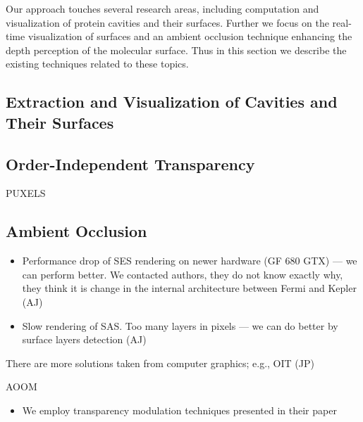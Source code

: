 Our approach touches several research areas, including computation and visualization of protein cavities and their surfaces. 
Further we focus on the real-time visualization of surfaces and an ambient occlusion technique enhancing the depth perception of the molecular surface. 
Thus in this section we describe the existing techniques related to these topics.

\subsection{Extraction and Visualization of Cavities and Their Surfaces}
\cite{totrov1996contour}
\cite{krone2009interactive}
\cite{lindow2010accelerated}
\cite{parulek2012implicit}
\cite{connolly1983analytical}


\subsection{Order-Independent Transparency}
\cite{carpenter1984abuffer}
\cite{everitt2001interactive}
\cite{bavoil2008order}
\cite{yang2010real}
\cite{enderton2011stochastic}
\cite{salvi2011adaptive}
\cite{maule2012memory}%
PUXELS \cite{kauker2013rendering}


\subsection{Ambient Occlusion}
\cite{tarini2006ambient}
\cite{grottel2012object}
\cite{staib2015ambient} 
\cite{borland2011ambient}




\begin{itemize}
  \item Performance drop of SES rendering on newer hardware (GF 680 GTX) --- we can perform better. We contacted authors, they do not know exactly why, they think it is change in the internal architecture between Fermi and Kepler (AJ)
  \item Slow rendering of SAS. Too many layers in pixels --- we can do better by surface layers detection (AJ)
\end{itemize}

There are more solutions taken from computer graphics; e.g., OIT (JP)

AOOM
\begin{itemize}
  \item We employ transparency modulation techniques presented in their paper \cite{borland2011ambient}
\end{itemize}

